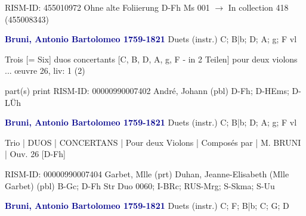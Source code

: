 \documentclass[twocolumn]{book}
\begin{document}
\newline RISM-ID: 455010972
\newline Ohne alte Foliierung
\newline D-Fh  Ms 001
\newline $\rightarrow$ In collection 418 (455008343)

\newline \par \vspace{7pt} \textcolor{darkblue}{\textbf{Bruni, Antonio Bartolomeo  1759-1821}}
\newline Duets (instr.)  C; B|b; D; A; g; F  
 vl
\newline \begin{itshape}Trois [= Six] duos concertants [C, B, D, A, g, F - in 2 Teilen] pour deux violons ... œuvre 26, liv: 1 (2)\end{itshape} 
\newline \textcolor{darkblue}{}  part(s)  
\newline print
\newline RISM-ID: 00000990007402
\newline André, Johann  (pbl)
\newline D-Fh; D-HEms; D-LÜh
\newline \par \vspace{7pt} \textcolor{darkblue}{\textbf{Bruni, Antonio Bartolomeo  1759-1821}}
\newline Duets (instr.)  C; B|b; D; A; g; F  
 vl
\newline \begin{itshape}Trio | DUOS | CONCERTANS | Pour deux Violons | Composés par | M. BRUNI | Ouv. 26 [D-Fh]\end{itshape} 
\newline RISM-ID: 00000990007404
\newline Garbet, Mlle  (prt)
\newline Duhan, Jeanne-Elisabeth (Mlle Garbet)  (pbl)
\newline B-Gc; D-Fh  Str Duo 0060; I-BRc; RUS-Mrg; S-Skma; S-Uu
\newline \par \vspace{7pt} \textcolor{darkblue}{\textbf{Bruni, Antonio Bartolomeo  1759-1821}}
\newline Duets (instr.)  C; F; B|b; C; G; D  
\end{document}
